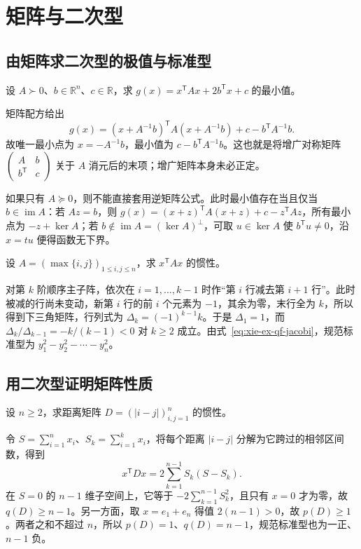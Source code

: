 \section{矩阵与二次型}
\label{sec:xie-ex-qf-matrix-view}

\subsection{由矩阵求二次型的极值与标准型}

\begin{example}
\label{ex:xie-ex-qf-minimum}
设 $A\succ0$、$b\in\mathbb R^n$、$c\in\mathbb R$，求 $g(x)=x^{\mathsf T}Ax+2b^{\mathsf T}x+c$ 的最小值。
\end{example}
\begin{solve}
矩阵配方给出
\[
 g(x)=(x+A^{-1}b)^{\mathsf T}A(x+A^{-1}b)+c-b^{\mathsf T}A^{-1}b.
\]
故唯一最小点为 $x=-A^{-1}b$，最小值为 $c-b^{\mathsf T}A^{-1}b$。这也就是将增广对称矩阵 $\begin{pmatrix}A&b\\b^{\mathsf T}&c\end{pmatrix}$ 关于 $A$ 消元后的末项；增广矩阵本身未必正定。
\end{solve}

如果只有 $A\succeq0$，则不能直接套用逆矩阵公式。此时最小值存在当且仅当 $b\in\operatorname{im}A$：若 $Az=b$，则 $g(x)=(x+z)^{\mathsf T}A(x+z)+c-z^{\mathsf T}Az$，所有最小点为 $-z+\ker A$；若 $b\notin\operatorname{im}A=(\ker A)^\perp$，可取 $u\in\ker A$ 使 $b^{\mathsf T}u\ne0$，沿 $x=tu$ 便得函数无下界。

\begin{example}
设 $A=(\max\{i,j\})_{1\le i,j\le n}$，求 $x^{\mathsf T}Ax$ 的惯性。
\end{example}
\begin{solve}
对第 $k$ 阶顺序主子阵，依次在 $i=1,\ldots,k-1$ 时作“第 $i$ 行减去第 $i+1$ 行”。此时被减的行尚未变动，新第 $i$ 行的前 $i$ 个元素为 $-1$，其余为零，末行全为 $k$，所以得到下三角矩阵，行列式为 $\Delta_k=(-1)^{k-1}k$。于是 $\Delta_1=1$，而 $\Delta_k/\Delta_{k-1}=-k/(k-1)<0$ 对 $k\ge2$ 成立。由式~\eqref{eq:xie-ex-qf-jacobi}，规范标准型为 $y_1^2-y_2^2-\cdots-y_n^2$。
\end{solve}

\subsection{用二次型证明矩阵性质}

\begin{example}
设 $n\ge2$，求距离矩阵 $D=(|i-j|)_{i,j=1}^n$ 的惯性。
\end{example}
\begin{solve}
令 $S=\sum_{i=1}^n x_i$、$S_k=\sum_{i=1}^k x_i$，将每个距离 $|i-j|$ 分解为它跨过的相邻区间数，得到
\[
 x^{\mathsf T}Dx=2\sum_{k=1}^{n-1}S_k(S-S_k).
\]
在 $S=0$ 的 $n-1$ 维子空间上，它等于 $-2\sum_{k=1}^{n-1}S_k^2$，且只有 $x=0$ 才为零，故 $q(D)\ge n-1$。另一方面，取 $x=e_1+e_n$ 得值 $2(n-1)>0$，故 $p(D)\ge1$。两者之和不超过 $n$，所以 $p(D)=1$、$q(D)=n-1$，规范标准型也为一正、$n-1$ 负。
\end{solve}

